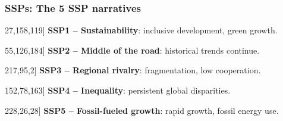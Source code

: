 \documentclass[xcolor=x11names,compress,aspectratio=169]{beamer}%
\makeatletter
\newcommand{\ssponebullet}{\textcolor[RGB]{27,158,119}{\large\textbullet}}
\newcommand{\ssptwobullet}{\textcolor[RGB]{55,126,184}{\large\textbullet}}
\newcommand{\sspthreebullet}{\textcolor[RGB]{217,95,2}{\large\textbullet}}
\newcommand{\sspfourbullet}{\textcolor[RGB]{152,78,163}{\large\textbullet}}
\newcommand{\sspfivebullet}{\textcolor[RGB]{228,26,28}{\large\textbullet}}
\renewenvironment{itemize}{\begin{compactitemize}[<+-| alert@+>]}{\end{compactitemize}}
\makeatother
\begin{document}
\begin{frame}%
%

\frametitle{SSPs: The 5 SSP narratives}%


\begin{itemize}
\item[\ssponebullet]
\textbf{\textcolor[RGB]{27,158,119}{SSP1 -- Sustainability}}:
 inclusive development, green growth.%
\vspace{2ex}%


\item[\ssptwobullet]
\textbf{\textcolor[RGB]{55,126,184}{SSP2 -- Middle of the road}}:
 historical trends continue.%
\vspace{2ex}%


\item[\sspthreebullet]
\textbf{\textcolor[RGB]{217,95,2}{SSP3 -- Regional rivalry}}:
 fragmentation, low cooperation.%
\vspace{2ex}%


\item[\sspfourbullet]
\textbf{\textcolor[RGB]{152,78,163}{SSP4 -- Inequality}}:
 persistent global disparities.%
\vspace{2ex}%


\item[\sspfivebullet]
\textbf{\textcolor[RGB]{228,26,28}{SSP5 -- Fossil-fueled growth}}:
 rapid growth, fossil energy use.
\end{itemize}

%

\transboxout
\end{frame}%
%
\end{document}
